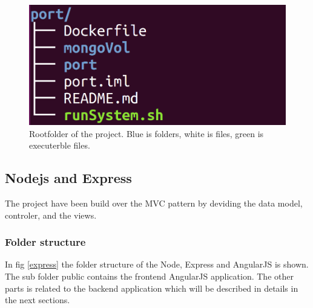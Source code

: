 \documentclass[a4paper,12pt,english]{article}
\begin{document}
\begin{center}

\begin{figure}[h]
\includegraphics[scale=0.2]{img/rootFolder.png}
\caption{Rootfolder of the project. Blue is folders, white is files, green is
executerble files.}
\label{rootFolder}
\end{figure}
\end{center}


\subsection{Nodejs and Express}
The project have been build over the MVC pattern by deviding the data model, controler, and the views.

\subsubsection{Folder structure}
In fig \ref{express} the folder structure of the Node, Express and AngularJS is
shown.
The sub folder public contains the frontend AngularJS application. The other
parts is related to the backend application which will be described in details
in the next sections.
\end{document}
